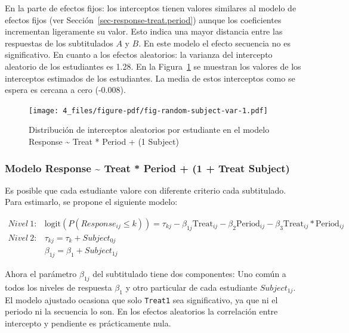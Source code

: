 \documentclass[
  12pt,
  a4paper,
  extrafontsizes,
  onecolumn,
  openright,
  table]{memoir}
\begin{document}
\normalsize

En la parte de efectos fijos: los interceptos tienen valores similares
al modelo de efectos fijos (ver Sección~\ref{sec-response-treat.period})
aunque los coeficientes incrementan ligeramente su valor. Esto indica
una mayor distancia entre las respuestas de los subtitulados \(A\) y
\(B\). En este modelo el efecto secuencia no es significativo. En cuanto
a los efectos aleatorios: la varianza del intercepto aleatorio de los
estudiantes es 1.28. En la Figura~\ref{fig-random-subject-var} se
muestran los valores de los interceptos estimados de los estudiantes. La
media de estos interceptos como se espera es cercana a cero (-0.008).

\begin{figure}[h]

{\centering \texttt{[image: 4\_files/figure-pdf/fig-random-subject-var-1.pdf]}

}

\caption[Distribución de interceptos aleatorios por
estudiante.]{\label{fig-random-subject-var}Distribución de interceptos
aleatorios por estudiante en el modelo Response \textasciitilde{} Treat
* Period + (1 \textbar{} Subject)}

\end{figure}

\hypertarget{modelo-response-treat-period-1-treat-subject}{%
\subsubsection{Modelo Response \textasciitilde{} Treat * Period + (1 +
Treat \textbar{}
Subject)}\label{modelo-response-treat-period-1-treat-subject}}

Es posible que cada estudiante valore con diferente criterio cada
subtitulado. Para estimarlo, se propone el siguiente modelo:

\small

\[
\begin{aligned}
Nivel\ 1: & \text{logit}(P(Response_{ij} \leq k)) = \tau_{kj} - \beta_{1j} \text{Treat}_{ij} - \beta_{2} \text{Period}_{ij} - \beta_{3} \text{Treat}_{ij} * \text{Period}_{ij} \\
Nivel\ 2: & \tau_{kj}  =  \tau_{k} + Subject_{0j} \\
          & \beta_{1j}  =  \beta_{1} + Subject_{1j}
\end{aligned}
\]

\normalsize

Ahora el parámetro \(\beta_{1j}\) del subtitulado tiene dos componentes:
Uno común a todos los niveles de respuesta \(\beta_{1}\) y otro
particular de cada estudiante \(Subject_{1j}\). El modelo ajustado
ocasiona que solo \texttt{Treat1} sea significativo, ya que ni el
periodo ni la secuencia lo son. En los efectos aleatorios la correlación
entre intercepto y pendiente es prácticamente nula.
\end{document}
